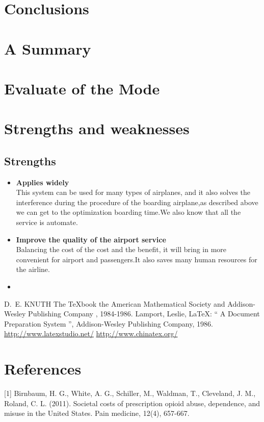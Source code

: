 \documentclass{mcmthesis}
\begin{document}
\section{Conclusions}
\lipsum[6]

\section{A Summary}
\lipsum[6]

\section{Evaluate of the Mode}

\section{Strengths and weaknesses}
\lipsum[12]

\subsection{Strengths}
\begin{itemize}
\item \textbf{Applies widely}\\
This  system can be used for many types of airplanes, and it also
solves the interference during  the procedure of the boarding
airplane,as described above we can get to the  optimization
boarding time.We also know that all the service is automate.
\item \textbf{Improve the quality of the airport service}\\
Balancing the cost of the cost and the benefit, it will bring in
more convenient  for airport and passengers.It also saves many
human resources for the airline. \item \textbf{}
\end{itemize}

\begin{thebibliography}{99}
 D.~E. KNUTH   The \TeX{}book  the American
Mathematical Society and Addison-Wesley
Publishing Company , 1984-1986.
Lamport, Leslie,  \LaTeX{}: `` A Document Preparation System '',
Addison-Wesley Publishing Company, 1986.
\url{http://www.latexstudio.net/}
\url{http://www.chinatex.org/}
\end{thebibliography}

\newpage
\section{References}
[1] Birnbaum, H. G., White, A. G., Schiller, M., Waldman, T., Cleveland, J. M., Roland, C. L. (2011). Societal costs of prescription opioid abuse, dependence, and misuse in the United States. Pain medicine, 12(4), 657-667.
\end{document}
